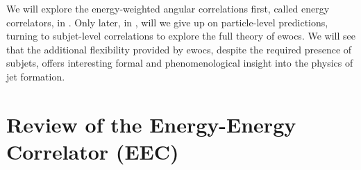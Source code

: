 We will explore the energy-weighted angular correlations first, called energy correlators, in .
%
Only later, in , will we give up on particle-level predictions, turning to subjet-level correlations to explore the full theory of \glspl{ewoc}.
%
We will see that the additional flexibility provided by \glspl{ewoc}, despite the required presence of subjets, offers interesting formal and phenomenological insight into the physics of jet formation.




\section{Review of the Energy-Energy Correlator (EEC)}
\label{sec:eec}


